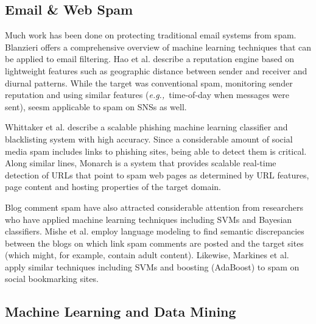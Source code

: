 \documentclass[preprint]{acm_proc_article-sp}
\newcommand{\eg}{{\em e.g.,}~}
\begin{document}
\subsection{Email \& Web Spam}

Much work has been done on protecting traditional email systems from spam. 
Blanzieri \cite{blanzieri} offers a comprehensive overview of machine learning techniques 
that can be applied to email filtering. Hao et al. \cite{hao} describe a reputation 
engine based on lightweight features such as geographic distance between sender and 
receiver and diurnal patterns. While the target was conventional 
spam, monitoring sender reputation and using similar features (\eg time-of-day when messages 
were sent), seesm applicable to spam on SNSs as well.

Whittaker et al. \cite{whittaker} describe a scalable phishing machine learning 
classifier and blacklisting system with high accuracy. Since a considerable 
amount of social media spam includes links to phishing sites, being able to 
detect them is critical. Along similar lines, Monarch \cite{thomas} is a 
system that provides scalable real-time detection of URLs that point to spam web pages as 
determined by URL features, page content and hosting properties of the target domain.

Blog comment spam have also attracted considerable attention from researchers who 
have applied machine learning \cite{kolari, nag} techniques including SVMs and Bayesian classifiers.
Mishe et al.\cite{mishne} employ language modeling to find semantic discrepancies between 
the blogs on which link spam comments are posted and the target sites (which might, for example, 
contain adult content). Likewise, Markines et al. \cite{markines} apply similar techniques 
including SVMs and boosting (AdaBoost) to spam on social bookmarking sites.

\subsection{Machine Learning and Data Mining}
\end{document}
